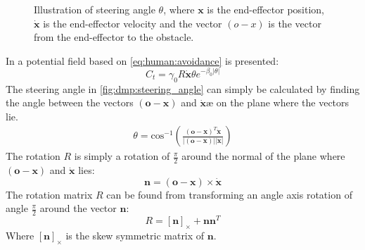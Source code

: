 \documentclass[../main.tex]{subfiles}
\begin{document}
\begin{figure}[H]
\begin{center}
\end{center}
\caption{Illustration of steering angle $\theta$, where $\boldsymbol{x}$ is the end-effector position, $\dot{\boldsymbol{x}}$ is the end-effector velocity and the vector $(o-x)$ is the vector from the end-effector to the obstacle.}
\label{fig:dmp:steering_angle}
\end{figure}

In \cite{rai_learning_2014} a potential field based on \autoref{eq:human:avoidance} is presented:
\begin{equation}
    C_t = \gamma_0 R \dot{\boldsymbol{x}} \theta e^{-\beta_0 |\theta|}
\end{equation}
The steering angle in \autoref{fig:dmp:steering_angle} can simply be calculated by finding the angle between the vectors $\boldsymbol{(o-x)}$ and $\boldsymbol{\dot{x}æ}$ on the plane where the vectors lie. 
\begin{align}
    \theta = \text{cos}^{-1}\left(\frac{\boldsymbol{(o-x)}^T\dot{\boldsymbol{x}}}{|\boldsymbol{(o-x)}| |\dot{\boldsymbol{x}}|}\right)
\end{align}
The rotation $R$ is simply a rotation of $\frac{\pi}{2}$ around the normal of the plane where $\boldsymbol{(o-x)}$ and $\dot{\boldsymbol{x}}$ lies:
\begin{equation}
    \boldsymbol{n} = \boldsymbol{(o-x)} \times \dot{\boldsymbol{x}}
\end{equation}
The rotation matrix $R$ can be found from transforming an angle axis rotation of angle $\frac{\pi}{2}$ around the vector $\boldsymbol{n}$:
\begin{equation}
    R = [\boldsymbol{n}]_{\times} + \boldsymbol{n}\boldsymbol{n}^T
\end{equation}
Where $[\boldsymbol{n}]_{\times}$ is the skew symmetric matrix of $\boldsymbol{n}$.
\end{document}
